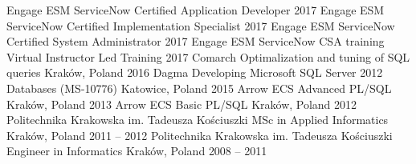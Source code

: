 \begin{cventries}
	\cventry
		{Engage ESM}
		{ServiceNow Certified Application Developer}
		{}
		{2017}
		{}
	\cventry
		{Engage ESM}
		{ServiceNow Certified Implementation Specialist}
		{}
		{2017}
		{}
	\cventry
		{Engage ESM}
		{ServiceNow Certified System Administrator}
		{}
		{2017}
		{}
	\cventry
		{Engage ESM}
		{ServiceNow CSA training}
		{Virtual Instructor Led Training}
		{2017}
		{}
	\cventry
		{Comarch}
		{Optimalization and tuning of SQL queries}
		{Kraków, Poland}
		{2016}
		{}
  \cventry
  	{Dagma}
  	{Developing Microsoft SQL Server 2012 Databases (MS-10776)}
  	{Katowice, Poland}
  	{2015}
  	{}
  \cventry
  	{Arrow ECS}
  	{Advanced PL/SQL}
  	{Kraków, Poland}
  	{2013}
  	{}
  \cventry
		{Arrow ECS}
		{Basic PL/SQL}
		{Kraków, Poland}
		{2012}
		{}
  \cventry
  	{Politechnika Krakowska im. Tadeusza Kościuszki}
    {MSc in Applied Informatics} %
    {Kraków, Poland} %
    {2011 -- 2012} %
    {}
  \cventry
    {Politechnika Krakowska im. Tadeusza Kościuszki} %
    {Engineer in Informatics} %
    {Kraków, Poland} %
    {2008 -- 2011} %
    {}

\end{cventries}
